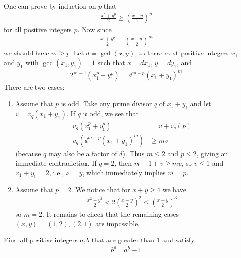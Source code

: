 \documentclass[main.tex]{subfile}
\begin{document}
    \begin{solution}
        One can prove by induction on $p$ that
        	\begin{align*}
        		\frac{x^p+y^p}2\ge \left(\frac{x+y}2\right)^p
        	\end{align*}
        for all positive integers $p$. Now since
        	\begin{align*}
        		\frac{x^p+y^p}{2}= \left( \frac{x+y}{2} \right)^m
        	\end{align*}
        we should have $ m \geq p$. Let $d=\gcd(x,y)$, so there exist positive integers
        $x_1$ and $y_1$ with $\gcd(x_1,y_1)=1$ such that $x=dx_1$, $y=dy_1$, and
        	\begin{align*}
        		2^{m-1}(x_1^p+y_1^p)=d^{m-p}(x_1+y_1)^m
        	\end{align*}
        There are two cases:

        \begin{enumerate}
        	\item Assume that $p$ is odd. Take any prime divisor $q$ of $x_1+y_1$ and let $v=v_q(x_1+y_1)$. If $q$ is odd, we see that
        		\begin{align*}
        			v_q(x_1^p +y_1^p)
        				& =v+v_q(p)\\
        			v_q(d^{m-p}(x_1+y_1)^m)
        				& \geq mv
        		\end{align*}
        	(because $q$  may also be a factor of $d$).
        	Thus $m\le 2$ and $p\le 2$, giving an immediate contradiction. If $q=2$, then $m-1+v\ge mv$, so $v\le 1$ and $x_1+y_1=2$, i.e., $x=y$, which immediately implies $m=p$.

        	\item Assume that $p=2$. We notice that for $x+y \geq 4$ we have
        		\begin{align*}
        			\frac{x^2+y^2}2< 2\left(\frac{x+y}2\right)^2\le \left(\frac{x+y}2\right)^3
        		\end{align*}
        	so $m=2$. It remains to check that the remaining cases $(x,y)=(1,2),(2,1)$ are impossible.
        \end{enumerate}

    \end{solution}

    \begin{problem}
        Find all positive integers $a,b$ that are greater than $1$ and satisfy
        	\begin{align*}
	        	b^a
	        		& \mid a^b-1
        	\end{align*}
    \end{problem}
\end{document}
